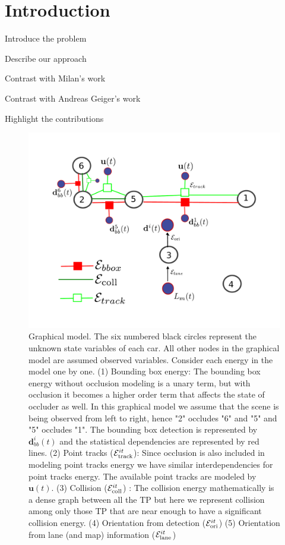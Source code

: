 \section{Introduction}
\label{sec:intro}

\begin{tight_itemize}
  \item Introduce the problem
  \item Describe our approach
  \item Contrast with Milan's work
  \item Contrast with Andreas Geiger's work
  \item Highlight the contributions
\end{tight_itemize}
\vspace{10cm}
\begin{figure}[!!t]
  \includegraphics[width=\columnwidth]{Figures/graphicalModelFrom61ConstVars.pdf}
  \caption{Graphical model. The six numbered black circles represent the
    unknown state variables of each car. All other nodes in the graphical model
    are assumed
    observed variables. Consider each energy in the model one by one. (1)
    Bounding box energy: The bounding box energy without occlusion modeling is
    a unary term, but with occlusion it becomes a higher order term that
    affects the state of occluder as well. In this graphical model we assume
    that the scene is being observed from left to right, hence "2" occludes "6"
    and "5" and "5" occludes "1". The bounding box detection is represented by
  $\mathbf{d}_{bb}^i(t)$ and the statistical dependencies are represented by
  red lines. (2) Point tracks ($\mathcal{E}^{it}_{\text{track}}$): Since occlusion is also
  included in modeling point tracks energy we have similar interdependencies
  for point tracks energy. The available point tracks are modeled by
  $\mathbf{u}(t)$. (3) Collision ($\mathcal{E}^{it}_{\text{coll}}$) : The collision energy
  mathematically is a dense graph between all the TP but here we represent
  collision among only those TP that are near enough to have a significant
collision energy. (4) Orientation from detection ($\mathcal{E}^{it}_{\text{ori}}$) (5) Orientation from lane (and map) information ($\mathcal{E}^{it}_{\text{lane}}$)}
  \label{fig:graphmodel}
\end{figure}
\begin{figure}
  \centering
  
  
\end{figure}
